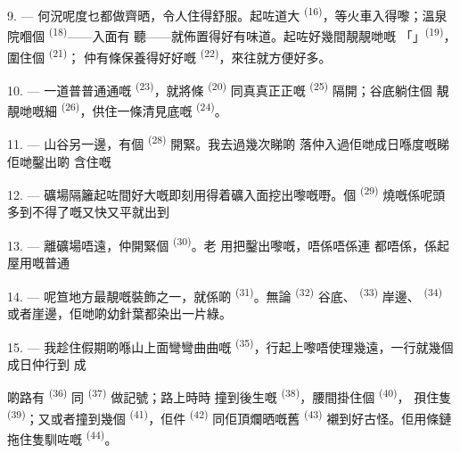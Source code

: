 \VUsaut{3.0mm}
\VUsaut{3.0mm}

9. --- 何況呢度乜都做齊晒，令人住得舒服。起咗道大
\textsuperscript{(16)}，等火車入得嚟；溫泉院嗰個 \textsuperscript{(18)}——入面有
聽——就佈置得好有味道。起咗好幾間靚靚哋嘅
「」\textsuperscript{(19)}，圍住個 \textsuperscript{(21)}；
仲有條保養得好好嘅
\textsuperscript{(22)}，來往就方便好多。

10. --- 一道普普通通嘅 \textsuperscript{(23)}，就將條
\textsuperscript{(20)} 同真真正正嘅 \textsuperscript{(25)} 隔開；谷底躺住個
靚靚哋嘅細 \textsuperscript{(26)}，供住一條清見底嘅 \textsuperscript{(24)}。

11. --- 山谷另一邊，有個 \textsuperscript{(28)} 開緊。我去過幾次睇啲
落仲入過佢哋成日喺度嘅睇佢哋鑿出啲
含住嘅

12. --- 礦場隔籬起咗間好大嘅即刻用得着礦入面挖出嚟嘅嘢。個
 \textsuperscript{(29)} 燒嘅係呢頭多到不得了嘅又快又平就出到

13. --- 離礦場唔遠，仲開緊個 \textsuperscript{(30)}。老
用把鑿出嚟嘅，唔係唔係連
都唔係，係起屋用嘅普通

14. --- 呢笪地方最靚嘅裝飾之一，就係啲 \textsuperscript{(31)}。無論
 \textsuperscript{(32)} 谷底、 \textsuperscript{(33)} 岸邊、
\textsuperscript{(34)} 或者崖邊，佢哋啲幼針葉都染出一片綠。

\VUsaut{3.0mm}
\VUsaut{3.0mm}

15. --- 我趁住假期啲喺山上面彎彎曲曲嘅
\textsuperscript{(35)}，行起上嚟唔使理幾遠，一行就幾個成日仲行到
成

啲路有 \textsuperscript{(36)} 同 \textsuperscript{(37)} 做記號；路上時時
撞到後生嘅 \textsuperscript{(38)}，腰間掛住個 \textsuperscript{(40)}，
孭住隻 \textsuperscript{(39)}；又或者撞到幾個
\textsuperscript{(41)}，佢件 \textsuperscript{(42)} 同佢頂爛晒嘅舊
\textsuperscript{(43)} 襯到好古怪。佢用條鏈拖住隻馴咗嘅 \textsuperscript{(44)}。

